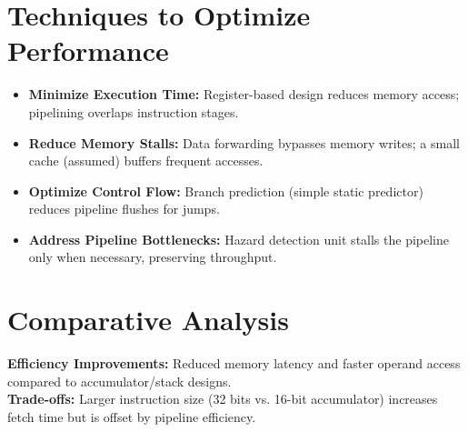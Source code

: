\documentclass[a4paper,12pt]{article}
\begin{document}
\section{Techniques to Optimize Performance}
\begin{itemize}
    \item \textbf{Minimize Execution Time:} Register-based design reduces memory access; pipelining overlaps instruction stages.
    \item \textbf{Reduce Memory Stalls:} Data forwarding bypasses memory writes; a small cache (assumed) buffers frequent accesses.
    \item \textbf{Optimize Control Flow:} Branch prediction (simple static predictor) reduces pipeline flushes for jumps.
    \item \textbf{Address Pipeline Bottlenecks:} Hazard detection unit stalls the pipeline only when necessary, preserving throughput.
\end{itemize}

\section{Comparative Analysis}
\begin{table}[ht]
    \centering
    \caption{Comparative Analysis of CPU Designs}
\end{table}
\textbf{Efficiency Improvements:} Reduced memory latency and faster operand access compared to accumulator/stack designs. \\
\textbf{Trade-offs:} Larger instruction size (32 bits vs. 16-bit accumulator) increases fetch time but is offset by pipeline efficiency.
\end{document}
